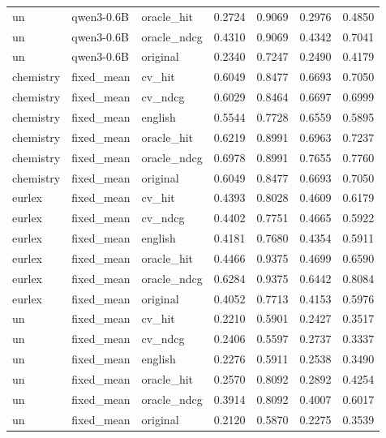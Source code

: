 \begin{tabular}{lllrrrr}
un & qwen3-0.6B & oracle\_hit & 0.2724 & 0.9069 & 0.2976 & 0.4850 \\
un & qwen3-0.6B & oracle\_ndcg & 0.4310 & 0.9069 & 0.4342 & 0.7041 \\
un & qwen3-0.6B & original & 0.2340 & 0.7247 & 0.2490 & 0.4179 \\
chemistry & fixed\_mean & cv\_hit & 0.6049 & 0.8477 & 0.6693 & 0.7050 \\
chemistry & fixed\_mean & cv\_ndcg & 0.6029 & 0.8464 & 0.6697 & 0.6999 \\
chemistry & fixed\_mean & english & 0.5544 & 0.7728 & 0.6559 & 0.5895 \\
chemistry & fixed\_mean & oracle\_hit & 0.6219 & 0.8991 & 0.6963 & 0.7237 \\
chemistry & fixed\_mean & oracle\_ndcg & 0.6978 & 0.8991 & 0.7655 & 0.7760 \\
chemistry & fixed\_mean & original & 0.6049 & 0.8477 & 0.6693 & 0.7050 \\
eurlex & fixed\_mean & cv\_hit & 0.4393 & 0.8028 & 0.4609 & 0.6179 \\
eurlex & fixed\_mean & cv\_ndcg & 0.4402 & 0.7751 & 0.4665 & 0.5922 \\
eurlex & fixed\_mean & english & 0.4181 & 0.7680 & 0.4354 & 0.5911 \\
eurlex & fixed\_mean & oracle\_hit & 0.4466 & 0.9375 & 0.4699 & 0.6590 \\
eurlex & fixed\_mean & oracle\_ndcg & 0.6284 & 0.9375 & 0.6442 & 0.8084 \\
eurlex & fixed\_mean & original & 0.4052 & 0.7713 & 0.4153 & 0.5976 \\
un & fixed\_mean & cv\_hit & 0.2210 & 0.5901 & 0.2427 & 0.3517 \\
un & fixed\_mean & cv\_ndcg & 0.2406 & 0.5597 & 0.2737 & 0.3337 \\
un & fixed\_mean & english & 0.2276 & 0.5911 & 0.2538 & 0.3490 \\
un & fixed\_mean & oracle\_hit & 0.2570 & 0.8092 & 0.2892 & 0.4254 \\
un & fixed\_mean & oracle\_ndcg & 0.3914 & 0.8092 & 0.4007 & 0.6017 \\
un & fixed\_mean & original & 0.2120 & 0.5870 & 0.2275 & 0.3539 \\
\bottomrule
\end{tabular}
